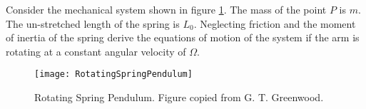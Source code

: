 \documentclass[graybox,envcountchap,sectrefs]{svmonoMuga}
\begin{document}
\begin{exercise}
Consider the mechanical system shown in figure \ref{Fig:RotatingSpringPendulum}.  The mass 
of the point $P$ is $m$. The un-stretched length of the spring is $L_0$. Neglecting friction and the moment of inertia of the spring derive the equations of motion of the system if the arm is rotating at a constant angular velocity of $\Omega$.
\begin{figure}[h]
\begin{center}
\texttt{[image: RotatingSpringPendulum]}
\renewcommand{\baselinestretch}{1}\selectfont
\caption{Rotating Spring Pendulum. Figure copied from G. T. Greenwood.}
\label{Fig:RotatingSpringPendulum}
\renewcommand{\baselinestretch}{1.5}\selectfont
\end{center}
\end{figure}
\end{exercise}
\end{document}
